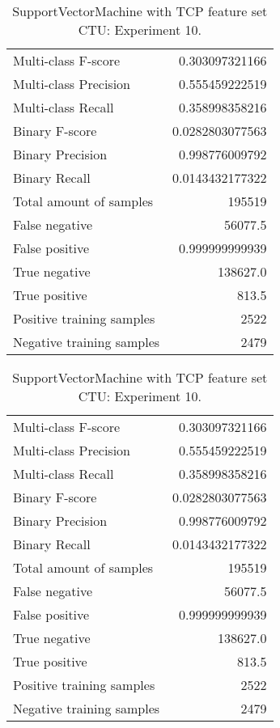 \begin{table}[H]
\begin{minipage}{0.5\textwidth}
\caption{SupportVectorMachine with TCP feature set CTU: Experiment 9.}
\centering
\begin{tabular}{l r}
\toprule
Multi-class F-score & 0.303097321166 \\
Multi-class Precision & 0.555459222519 \\
Multi-class Recall & 0.358998358216 \\
\midrule
Binary F-score & 0.0282803077563 \\
Binary Precision & 0.998776009792 \\
Binary Recall & 0.0143432177322 \\
\midrule
Total amount of samples & 195519 \\
False negative & 56077.5 \\
False positive & 0.999999999939 \\
True negative & 138627.0 \\
True positive & 813.5 \\
\midrule
Positive training samples & 2522 \\
Negative training samples & 2479 \\
\bottomrule
\end{tabular}
\end{minipage}
\hfillx
\begin{minipage}{0.5\textwidth}
\caption{SupportVectorMachine with TCP feature set CTU: Experiment 10.}
\centering
\begin{tabular}{l r}
\toprule
Multi-class F-score & 0.303097321166 \\
Multi-class Precision & 0.555459222519 \\
Multi-class Recall & 0.358998358216 \\
\midrule
Binary F-score & 0.0282803077563 \\
Binary Precision & 0.998776009792 \\
Binary Recall & 0.0143432177322 \\
\midrule
Total amount of samples & 195519 \\
False negative & 56077.5 \\
False positive & 0.999999999939 \\
True negative & 138627.0 \\
True positive & 813.5 \\
\midrule
Positive training samples & 2522 \\
Negative training samples & 2479 \\
\bottomrule
\end{tabular}
\end{minipage}
\end{table}
